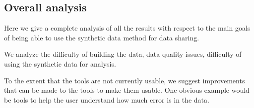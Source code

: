 \subsection{Overall analysis}
\label{sec:overall}

Here we give a complete analysis of all the results with respect to the main goals of being able to use the synthetic data method for data sharing.

We analyze the difficulty of building the data, data quality issues, difficulty of using the synthetic data for analysis. 

To the extent that the tools are not currently usable, we suggest improvements that can be made to the tools to make them usable. One obvious example would be tools to help the user understand how much error is in the data.

